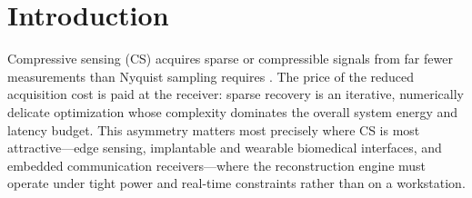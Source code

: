 
\section{Introduction}
\label{sec:introduction}

Compressive sensing (CS) acquires sparse or compressible signals from far
fewer measurements than Nyquist sampling requires
\cite{donoho2006compressed, candes2008introduction}. The price of the reduced
acquisition cost is paid at the receiver: sparse recovery is an iterative,
numerically delicate optimization whose complexity dominates the overall
system energy and latency budget. This asymmetry matters most precisely where
CS is most attractive---edge sensing, implantable and wearable biomedical
interfaces, and embedded communication receivers---where the reconstruction
engine must operate under tight power and real-time constraints rather than
on a workstation.



